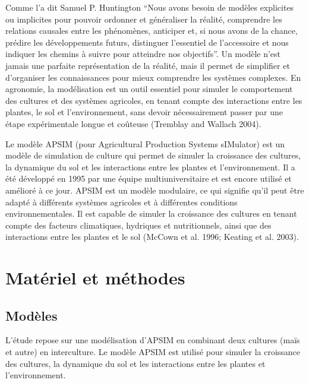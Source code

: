 \documentclass[
]{article}
\begin{document}
Comme l'a dit Samuel P. Huntington ``Nous avons besoin de modèles
explicites ou implicites pour pouvoir ordonner et généraliser la
réalité, comprendre les relations causales entre les phénomènes,
anticiper et, si nous avons de la chance, prédire les développements
futurs, distinguer l'essentiel de l'accessoire et nous indiquer les
chemins à suivre pour atteindre nos objectifs''. Un modèle n'est jamais
une parfaite représentation de la réalité, mais il permet de simplifier
et d'organiser les connaissances pour mieux comprendre les systèmes
complexes. En agronomie, la modélisation est un outil essentiel pour
simuler le comportement des cultures et des systèmes agricoles, en
tenant compte des interactions entre les plantes, le sol et
l'environnement, sans devoir nécessairement passer par une étape
expérimentale longue et coûteuse (Tremblay and Wallach 2004).

Le modèle APSIM (pour Agricultural Production Systems sIMulator) est un
modèle de simulation de culture qui permet de simuler la croissance des
cultures, la dynamique du sol et les interactions entre les plantes et
l'environnement. Il a été développé en 1995 par une équipe
multiuniversitaire et est encore utilisé et amélioré à ce jour. APSIM
est un modèle modulaire, ce qui signifie qu'il peut être adapté à
différents systèmes agricoles et à différentes conditions
environnementales. Il est capable de simuler la croissance des cultures
en tenant compte des facteurs climatiques, hydriques et nutritionnels,
ainsi que des interactions entre les plantes et le sol (McCown et al.
1996; Keating et al. 2003).\\

\section{Matériel et méthodes}\label{matuxe9riel-et-muxe9thodes}

\subsection{Modèles}\label{moduxe8les}

L'étude repose sur une modélisation d'APSIM en combinant deux cultures
(maïs et autre) en interculture. Le modèle APSIM est utilisé pour
simuler la croissance des cultures, la dynamique du sol et les
interactions entre les plantes et l'environnement.
\end{document}
